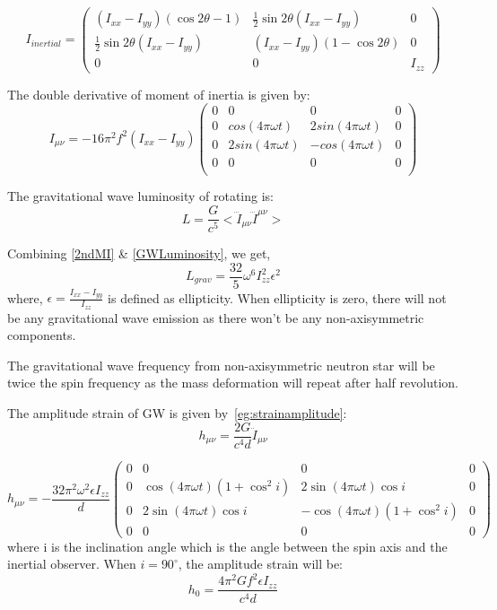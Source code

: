 \documentclass{ttuthes2007}
\begin{document}
\begin{equation}
I_{inertial}=
\begin{pmatrix}
(I_{xx}-I_{yy})(\cos2\theta -1) & \frac{1}{2}\sin2\theta(I_{xx}-I_{yy}) & 0 \\
\frac{1}{2}\sin2\theta(I_{xx}-I_{yy}) & (I_{xx}-I_{yy})(1-\cos2\theta) & 0  \\
0 & 0 & I_{zz}
\end{pmatrix}
\end{equation}

The double derivative of moment of inertia is given by:
\begin{equation} \label{2ndMI}
I_{\mu\nu}=-16\pi ^2f^2(I_{xx}-I_{yy})
\begin{pmatrix}
0 & 0 & 0 & 0 \\
0 & cos(4\pi\omega t) & 2sin(4\pi\omega t) & 0 \\
0 & 2sin(4\pi\omega t) & -cos(4\pi\omega t) & 0 \\
0 & 0 & 0 & 0 \\
\end{pmatrix}
\end{equation}

The gravitational wave luminosity of rotating is:
\begin{equation}\label{GWLuminosity}
L= \frac{G}{c^5}<\dddot{I}_{\mu\nu}\dddot{I}^{\mu\nu}>
\end{equation}

Combining \ref{2ndMI} \& \ref{GWLuminosity}, we get,
\begin{equation}\label{Lgw}
L_{grav}= \frac{32}{5}\omega ^6 I_{zz}^2\epsilon ^2
\end{equation}
where, $\epsilon =\frac{I_{xx}-I_{yy}}{I_{zz}}$ is defined as ellipticity. When
ellipticity is zero, there will not be any gravitational wave emission as there
won't be any non-axisymmetric components.

The gravitational wave frequency from non-axisymmetric neutron star will be
twice the spin frequency as the mass deformation will repeat after half
revolution.

The amplitude strain of \ac{GW} is given by~\ref{eg:strainamplitude}:
\begin{equation}
h_{\mu\nu}=\frac{2G}{c^4d}\ddot{I}_{\mu\nu}
\end{equation}


\begin{equation} \label{2ndMI}
h_{\mu\nu}=-\frac{32\pi ^2\omega^2 \epsilon I_{zz}}{d}
\begin{pmatrix}
0 & 0 & 0 & 0 \\
0 & \cos(4\pi \omega t)(1+\cos ^2i) & 2\sin(4\pi \omega t)\cos i & 0 \\
0 & 2\sin(4\pi\omega t)\cos i & -\cos(4\pi\omega t)(1+\cos ^2i) & 0 \\
0 & 0 & 0 & 0 
\end{pmatrix}
\end{equation}
where i is the inclination angle which is the angle between the spin axis and
the inertial observer. When $i=90^\circ$, the amplitude strain will be:
\begin{equation}
h_0=\frac{4\pi ^2Gf^2 \epsilon I_{zz}}{c^4d}
\end{equation}
\end{document}

